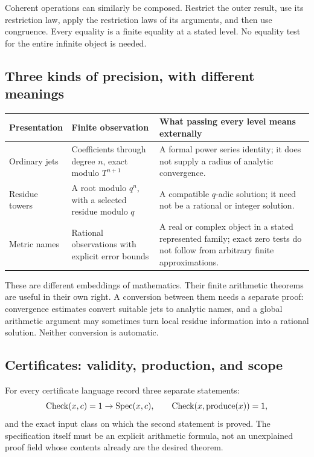 Coherent operations can similarly be composed. Restrict the outer result,
use its restriction law, apply the restriction laws of its arguments,
and then use congruence. Every equality is a finite equality at a stated
level. No equality test for the entire infinite object is needed.

\subsection{Three kinds of precision, with different meanings}

\begin{center}\small
\begin{tabular}{P{.20\linewidth}P{.30\linewidth}P{.40\linewidth}}
\toprule
Presentation & Finite observation & What passing every level means externally\\
\midrule
Ordinary jets & Coefficients through degree \(n\), exact modulo
\(T^{n+1}\) & A formal power series identity; it does not supply a radius
of analytic convergence.\\[3pt]
Residue towers & A root modulo \(q^n\), with a selected residue modulo
\(q\) & A compatible \(q\)-adic solution; it need not be a rational or
integer solution.\\[3pt]
Metric names & Rational observations with explicit error bounds & A real
or complex object in a stated represented family; exact zero tests do not
follow from arbitrary finite approximations.\\
\bottomrule
\end{tabular}
\end{center}

These are different embeddings of mathematics. Their finite arithmetic
theorems are useful in their own right. A conversion between them needs a
separate proof: convergence estimates convert suitable jets to analytic
names, and a global arithmetic argument may sometimes turn local residue
information into a rational solution. Neither conversion is automatic.

\subsection{Certificates: validity, production, and scope}

For every certificate language record three separate statements:
\[
 \operatorname{Check}(x,c)=1\to \operatorname{Spec}(x,c),\qquad
 \operatorname{Check}(x,\operatorname{produce}(x))=1,
\]
and the exact input class on which the second statement is proved.
The specification itself must be an explicit arithmetic formula, not an
unexplained proof field whose contents already are the desired theorem.

